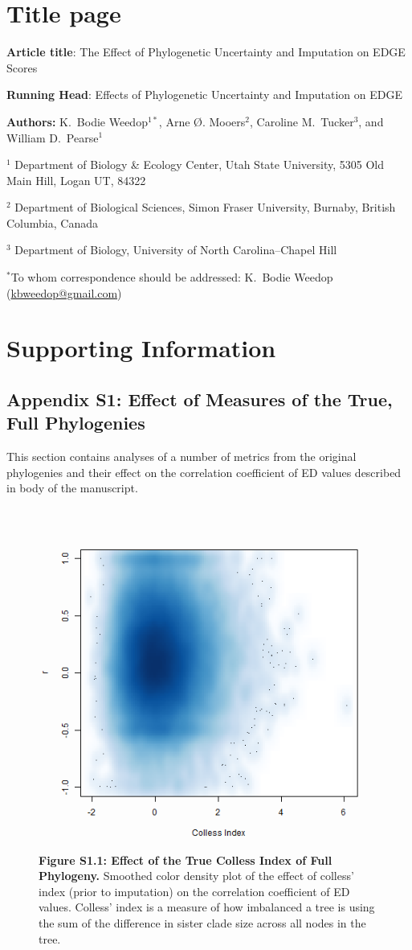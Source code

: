 \documentclass[10pt,english]{article}
\begin{document}
\section*{Title page}

\textbf{Article title}: The Effect of Phylogenetic Uncertainty and Imputation on EDGE Scores

\textbf{Running Head}: Effects of Phylogenetic Uncertainty and Imputation on EDGE

\textbf{Authors:} K.\ Bodie Weedop$^{1*}$, Arne \O. Mooers$^2$, Caroline M.\ Tucker$^3$, and William D.\ Pearse$^{1}$\

$^1$ Department of Biology \& Ecology Center, Utah State University,
5305 Old Main Hill, Logan UT, 84322

$^2$ Department of Biological Sciences, Simon Fraser University, Burnaby,
British Columbia, Canada

$^3$ Department of Biology, University of North Carolina–Chapel Hill

$^*$To whom correspondence should be addressed: K.\ Bodie Weedop (\url{kbweedop@gmail.com})

\clearpage
 
\section*{Supporting Information}

\subsection*{Appendix S1: Effect of Measures of the True, Full Phylogenies}

This section contains analyses of a number of metrics from the original
phylogenies and their effect on the correlation coefficient of ED values
described in body of the manuscript.

\begin{figure}[!ht]
  \center
  \includegraphics[width=.5\textwidth]{../figures/trueColless.png}
  \caption*{\textbf{Figure S1.1: Effect of the True Colless Index of Full Phylogeny.} 
  Smoothed color density plot of the effect of colless' index (prior to
  imputation) on the correlation coefficient of ED values. Colless' index is a
  measure of how imbalanced a tree is using the sum of the difference in sister
  clade size across all nodes in the tree.}
\end{figure}
\end{document}
